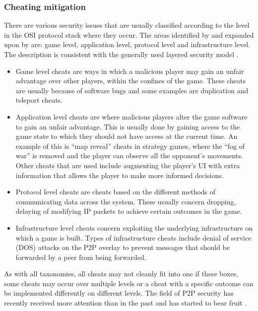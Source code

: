 \subsubsection{Cheating mitigation}
\label{key_challenges_cheating}

There are various security issues that are usually classified according to the level in the OSI protocol stack where they occur. The areas identified by \cite{cheat_proof_event_ordering} and expanded upon by \cite{cheating_taxonomy} are: game level, application level, protocol level and infrastructure level. The description is consistent with the generally used layered security model \cite{distributed_systems_security}.

\begin{itemize}
\item Game level cheats are ways in which a malicious player may gain an unfair advantage over other players, within the confines of the game. These cheats are usually because of software bugs and some examples are duplication and teleport cheats.

\item Application level cheats are where malicious players alter the game software to gain an unfair advantage. This is usually done by gaining access to the game state to which they should not have access at the current time. An example of this is ``map reveal'' cheats in strategy games, where the ``fog of war'' is removed and the player can observe all the opponent's movements. Other cheats that are used include augmenting the player's UI with extra information that allows the player to make more informed decisions.

\item Protocol level cheats are cheats based on the different methods of communicating data across the system. These usually concern dropping, delaying of modifying IP packets to achieve certain outcomes in the game.

\item Infrastructure level cheats concern exploiting the underlying infrastructure on which a game is built. Types of infrastructure cheats include denial of service (DOS) attacks on the P2P overlay to prevent messages that should be forwarded by a peer from being forwarded.
\end{itemize}

As with all taxonomies, all cheats may not cleanly fit into one if these boxes, some cheats may occur over multiple levels or a cheat with a specific outcome can be implemented differently on different levels. The field of P2P security has recently received more attention than in the past and has started to bear fruit \cite{survey_p2p_game_cheats}.

